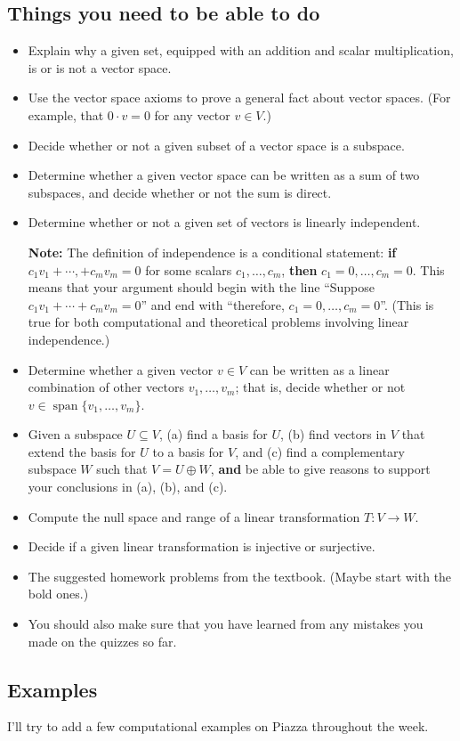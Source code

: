 \documentclass[12pt,letterpaper]{article}
\DeclareMathOperator{\spn}{span}
\begin{document}
\subsection*{Things you need to be able to do}
\begin{itemize}
\item Explain why a given set, equipped with an addition and scalar multiplication, is or is not a vector space.
\item Use the vector space axioms to prove a general fact about vector spaces. (For example, that $0\cdot v = 0$ for any vector $v\in V$.)
\item Decide whether or not a given subset of a vector space is a subspace.
\item Determine whether a given vector space can be written as a sum of two subspaces, and decide whether or not the sum is direct.
\item Determine whether or not a given set of vectors is linearly independent.

{\bf Note:} The definition of independence is a conditional statement: {\bf if} $c_1v_1+\cdots, + c_mv_m=0$ for some scalars $c_1,\ldots, c_m$, {\bf then} $c_1=0,\ldots, c_m=0$. This means that your argument should begin with the line ``Suppose $c_1v_1+\cdots+c_mv_m=0$'' and end with ``therefore, $c_1=0,\ldots, c_m=0$''. (This is true for both computational and theoretical problems involving linear independence.)
\item Determine whether a given vector $v\in V$ can be written as a linear combination of other vectors $v_1,\ldots, v_m$; that is, decide whether or not $v\in\spn\{v_1,\ldots, v_m\}$.
\item Given a subspace $U\subseteq V$, (a) find a basis for $U$, (b) find vectors in $V$ that extend the basis for $U$ to a basis for $V$, and (c) find a complementary subspace $W$ such that $V=U\oplus W$, {\bf and} be able to give reasons to support your conclusions in (a), (b), and (c).
\item Compute the null space and range of a linear transformation $T:V\to W$.
\item Decide if a given linear transformation is injective or surjective.
\item The suggested homework problems from the textbook. (Maybe start with the bold ones.)
\item You should also make sure that you have learned from any mistakes you made on the quizzes so far.
\end{itemize}
\subsection*{Examples}
I'll try to add a few computational examples on Piazza throughout the week. 
\end{document}
